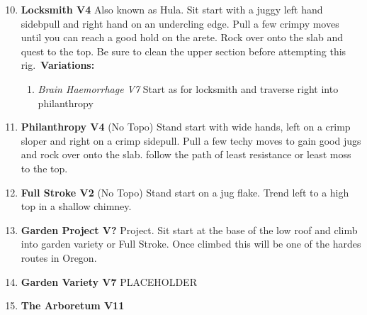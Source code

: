 \begin{multicols*}{2}
				\begin{enumerate}[]
					\setcounter{enumi}{9}
					\item\label{rt:Locksmith} \colorbox{RoyalBlue!20}{\textbf{Locksmith V4 \ding{72}    \warn \warn } }
					\newline Also known as Hula. Sit start with a juggy left hand sidebpull and right hand on an undercling edge. Pull a few crimpy moves until you can reach a good hold on the arete. Rock over onto the slab and quest to the top. Be sure to clean the upper section before attempting this rig.\
					\newline \textbf{Variations:}
					\begin{enumerate}
						\item\label{vr:Brain Haemorrhage} \colorbox{Goldenrod!50}{\emph{Brain Haemorrhage V7  }  }
						\newline Start as for locksmith and traverse right into philanthropy\
					\end{enumerate}
					\setcounter{enumi}{10}
					\item\label{rt:Philanthropy} \colorbox{RoyalBlue!20}{\textbf{Philanthropy V4   \warn \warn } }
						\newline (No Topo) 
					\newline Stand start with wide hands, left on a crimp sloper and right on a crimp sidepull. Pull a few techy moves to gain good jugs and rock over onto the slab. follow the path of least resistance or least moss to the top.\
					\setcounter{enumi}{11}
					\item\label{rt:Full Stroke} \colorbox{green!20}{\textbf{Full Stroke V2    \warn } }
						\newline (No Topo) 
					\newline Stand start on a jug flake. Trend left to a high top in a shallow chimney.\
					\setcounter{enumi}{12}
					\item\label{rt:Garden Project} \colorbox{black!20}{\textbf{Garden Project V?  } }
					\newline Project. Sit start at the base of the low roof and climb into garden variety or Full Stroke. Once climbed this will be one of the hardes routes in Oregon.\
					\setcounter{enumi}{13}
					\item\label{rt:Garden Variety} \colorbox{Goldenrod!50}{\textbf{Garden Variety V7  } }
					\newline PLACEHOLDER\
					\setcounter{enumi}{14}
					\item\label{rt:The Arboretum} \colorbox{red!20}{\textbf{The Arboretum V11  } }

\end{enumerate}
\end{multicols*}
